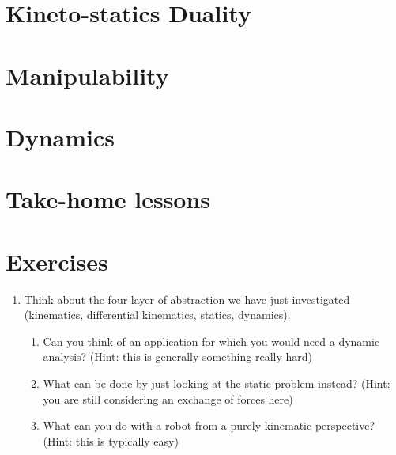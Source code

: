 



\section{Kineto-statics Duality}

\section{Manipulability}

\section{Dynamics}\label{ch:forces:dynamics}


\section*{Take-home lessons}

\section*{Exercises}\small

\begin{enumerate}
\item Think about the four layer of abstraction we have just investigated (kinematics, differential kinematics, statics, dynamics).
\begin{enumerate}
\item Can you think of an application for which you would need a dynamic analysis? (Hint: this is generally something really hard)
\item What can be done by just looking at the static problem instead? (Hint: you are still considering an exchange of forces here)
\item What can you do with a robot from a purely kinematic perspective? (Hint: this is typically easy)
\end{enumerate}
\end{enumerate}
